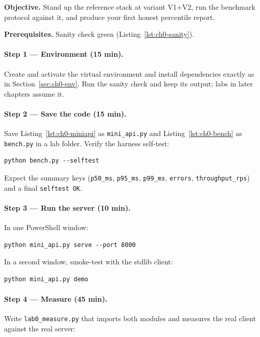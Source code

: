 \textbf{Objective.} Stand up the reference stack at variant V1+V2, run the
benchmark protocol against it, and produce your first honest percentile
report.

\textbf{Prerequisites.} Sanity check green
(Listing~\ref{lst:ch0-sanity}).

\paragraph{Step 1 --- Environment (15 min).}
Create and activate the virtual environment and install dependencies exactly
as in Section~\ref{sec:ch0-env}. Run the sanity check and keep its output;
labs in later chapters assume it.

\paragraph{Step 2 --- Save the code (15 min).}
Save Listing~\ref{lst:ch0-miniapi} as \texttt{mini\_api.py} and
Listing~\ref{lst:ch0-bench} as \texttt{bench.py} in a lab folder. Verify the
harness self-test:

\begin{verbatim}
python bench.py --selftest
\end{verbatim}

Expect the summary keys (\texttt{p50\_ms}, \texttt{p95\_ms},
\texttt{p99\_ms}, \texttt{errors}, \texttt{throughput\_rps}) and a final
\texttt{selftest OK}.

\paragraph{Step 3 --- Run the server (10 min).}
In one PowerShell window:

\begin{verbatim}
python mini_api.py serve --port 8000
\end{verbatim}

In a second window, smoke-test with the stdlib client:

\begin{verbatim}
python mini_api.py demo
\end{verbatim}

\paragraph{Step 4 --- Measure (45 min).}
Write \texttt{lab0\_measure.py} that imports both modules and measures the
real client against the real server:

